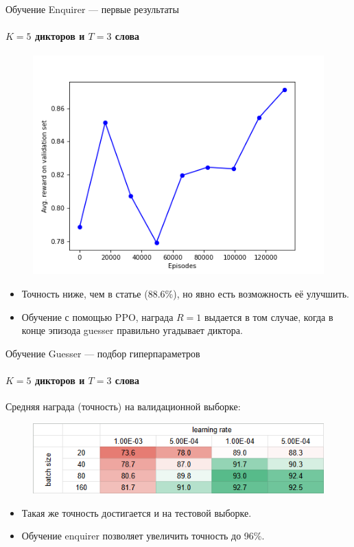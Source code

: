 \documentclass{beamer}
\begin{document}
\begin{frame}{Обучение Enquirer --- первые результаты}
    \framesubtitle{$K = 5$ дикторов и $T = 3$ слова}
    \begin{figure}
        \centering
        \includegraphics[scale=0.4]{enquirer_training_v1.png}
    \end{figure}
    \begin{itemize}
        \item Точность ниже, чем в статье (88.6\%), но явно есть возможность её
        улучшить.
        \item Обучение с помощью PPO, награда $R=1$ выдается в том случае, когда
        в конце эпизода guesser правильно угадывает диктора.
    \end{itemize}
\end{frame}

\begin{frame}{Обучение Guesser --- подбор гиперпараметров}
    \framesubtitle{$K = 5$ дикторов и $T = 3$ слова}
    Средняя награда (точность) на валидационной выборке:
    \begin{figure}
        \centering
        \includegraphics[width=.7\textwidth]{guesser_hpo.png}
    \end{figure}
    \begin{itemize}
        \item Такая же точность достигается и на тестовой выборке.
        \item Обучение enquirer позволяет увеличить точность до 96\%.
    \end{itemize}
\end{frame}
\end{document}
